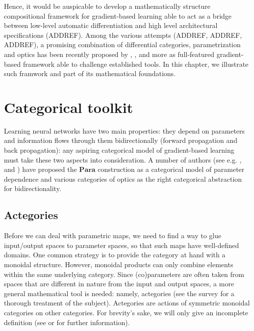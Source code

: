 \documentclass[12pt,a4paper,openright,twoside]{report}
\theoremstyle{plain}
\theoremstyle{definition}
\begin{document}
Hence, it would be auspicable to develop a mathematically structure compositional framework for gradient-based learning able to act as a bridge between low-level automatic differentiation and high level architectural specifications (ADDREF). Among the various attempts (ADDREF, ADDREF, ADDREF), a promising combination of differential categories, parametrization and optics has been recently proposed by \cite{cockett2019reverse}, \cite{cruttwell2022categorical}, \cite{gavranovic2024fundamental} and more as full-featured gradient-based framework able to challenge established tools. In this chapter, we illustrate such framwork  and part of its mathematical foundations. 



\section{Categorical toolkit}

Learning neural networks have two main properties: they depend on parameters and information flows through them bidirectionally (forward propagation and back propagation): any aspiring categorical model of gradient-based learning must take these two aspects into consideration. A number of authors (see e.g. \cite{gavranovic2024fundamental}, and \cite{cruttwell2022categorical}) have proposed the $\mathbf{Para}$ construction as a categorical model of parameter dependence and various categories of optics as the right categorical abstraction for bidirectionality.

\subsection{Actegories}

Before we can deal with parametric maps, we need to find a way to glue input/output spaces to parameter spaces, so that such maps have well-defined domains. One common strategy is to provide the category at hand with a monoidal structure. However, monoidal products can only combine elements within the same underlying category. Since (co)parameters are often taken from spaces that are different in nature from the input and output spaces, a more general mathematical tool is needed: namely, actegories (see the survey \cite{capucci2022actegories} for a thorough treatment of the subject).  Actegories are actions of symmetric monoidal categories on other categories. For brevity's sake, we will only give an incomplete definition (see \cite{capucci2022actegories} or \cite{gavranovic2024fundamental} for further information).
\end{document}

